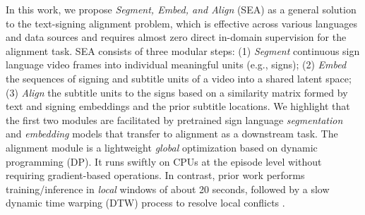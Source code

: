 \documentclass[11pt]{article}
\newcommand{\jyj}[1]{{\textcolor{purple}{[\textbf{jyj: #1}]}}} %
\newcommand{\az}[1]{{\color{blue}[az: #1]}} %
\newcommand{\lili}[1]{{\color{green}[lili: #1]}} %
\begin{document}

In this work, we propose \textit{Segment, Embed, and Align} (SEA) as a general solution to the text-signing alignment problem, which is effective across various languages and data sources and requires almost zero direct in-domain supervision for the alignment task. 
SEA consists of three modular steps:
(1) \textit{Segment} continuous sign language video frames into individual meaningful units (e.g., signs);
(2) \textit{Embed} the sequences of signing and subtitle units of a video into a shared latent space;
(3) \textit{Align} the subtitle units to the signs based on a similarity matrix formed by text and signing embeddings and the prior subtitle locations.
We highlight that the first two modules are facilitated by pretrained sign language  \textit{segmentation} \citep{moryossef-etal-2023-linguistically} and \textit{embedding} \citep{jiang-etal-2024-signclip} models that transfer to alignment as a downstream task. 
The alignment module is a lightweight {\em global} optimization based on dynamic programming (DP). 
It runs swiftly on CPUs at the episode level without requiring gradient-based operations. 
In contrast, prior work performs training/inference in {\em local} windows of about 20 seconds, followed by a slow dynamic time warping (DTW) process to resolve local conflicts \citep{bull2021aligning}.
\end{document}
